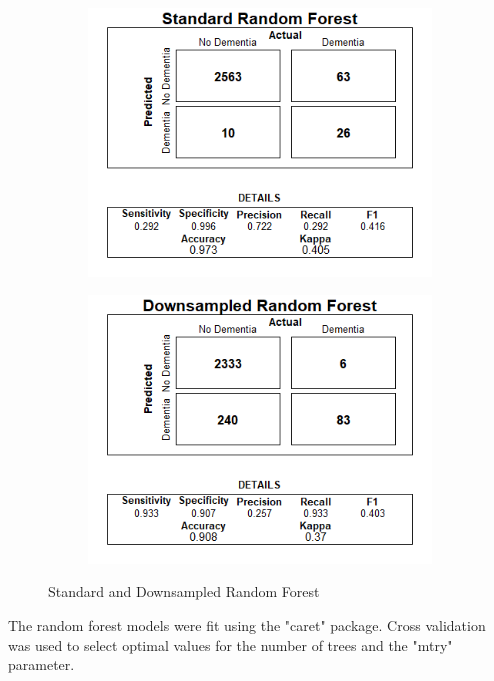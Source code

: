 \documentclass[a4paper,man,natbib,11pt]{article}
\begin{document}
\begin{figure}
\centering
\begin{subfigure}{.5\textwidth}
  \centering
  \includegraphics[width=\linewidth]{standard_rf.png}
\end{subfigure}%
\begin{subfigure}{.5\textwidth}
  \centering
  \includegraphics[width=\linewidth]{downsampled_rf.png}
\end{subfigure}
\caption{Standard and Downsampled Random Forest}
\label{fig:test}
\end{figure}

The random forest models were fit using the "caret" package. Cross validation was used to select optimal values for the number of trees and the "mtry" parameter.
\end{document}

